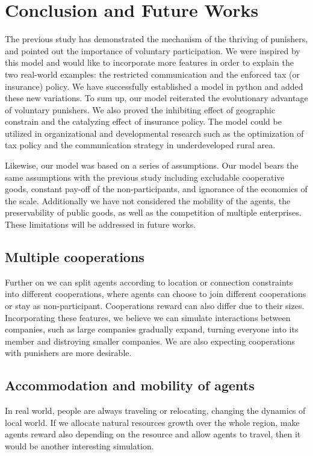\documentclass[11pt]{article}
\begin{document}
\section{Conclusion and Future Works}
The previous study has demonstrated the mechanism of the thriving of punishers, and pointed out the importance of voluntary participation. We were inspired by this model and would like to incorporate more features in order to explain the two real-world examples: the restricted communication and the enforced tax (or insurance) policy. We have successfully established a model in python and added these new variations. To sum up, our model reiterated the evolutionary advantage of voluntary punishers. We also proved the inhibiting effect of geographic constrain and the catalyzing effect of insurance policy. The model could be utilized in organizational and developmental research such as the optimization of tax policy and the communication strategy in underdeveloped rural area.

Likewise, our model was based on a series of assumptions. Our model bears the same assumptions with the previous study including excludable cooperative goods, constant pay-off of the non-participants, and ignorance of the economics of the scale. Additionally we have not considered the mobility of the agents, the preservability of public goods, as well as the competition of multiple enterprises. These limitations will be addressed in future works.

\subsection{Multiple cooperations}
Further on we can split agents according to location or connection constraints into different cooperations, where agents can choose to join different cooperations or stay as non-participant. Cooperations reward can also differ due to their sizes. Incorporating these features, we believe we can simulate interactions between companies, such as large companies gradually expand, turning everyone into its member and distroying smaller companies. We are also expecting cooperations with punishers are more desirable.

\subsection{Accommodation and mobility of agents}
In real world, people are always traveling or relocating, changing the dynamics of local world. If we allocate natural resources growth over the whole region, make agents reward also depending on the resource and allow agents to travel, then it would be another interesting simulation.



\end{document}
